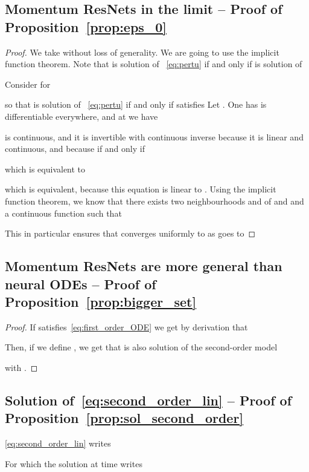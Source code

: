\documentclass{article}
\begin{document}
\subsection{Momentum ResNets in the limit  -- Proof of Proposition~\ref{prop:eps_0}}\label{app:prop_eps_0}

\begin{proof}
We take  without loss of generality.
We are going to use the implicit function theorem. 
Note that  is solution of ~\eqref{eq:pertu} if and only if  is solution of

Consider for  

so that  is solution of ~\eqref{eq:pertu} if and only if  satisfies  
Let .
One has 
 is differentiable everywhere, and at  we have

 is continuous, and it is invertible with continuous inverse because it is linear and continuous, and because  if and only if

which is equivalent to 

which is equivalent, because this equation is linear to .
Using the implicit function theorem, we know that there exists two neighbourhoods  and  of  and  and a continuous function  such that

This in particular ensures that  converges uniformly to  as  goes to 
\end{proof}




\subsection{Momentum ResNets are more general than neural ODEs -- Proof of Proposition~\ref{prop:bigger_set}}
\begin{proof}
If  satisfies~\eqref{eq:first_order_ODE} we get by derivation that

Then, if we define , we get that  is also solution of the second-order model

with 
.
\end{proof} 


\subsection{Solution of~\eqref{eq:second_order_lin} -- Proof of Proposition~\ref{prop:sol_second_order}}

\eqref{eq:second_order_lin} writes



For which the solution at time  writes
\end{document}

